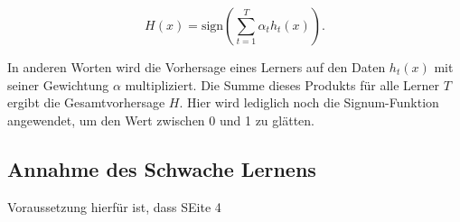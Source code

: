 \begin{equation}
    H(x) = \text{sign}\left(\sum_{t=1}^{T} \alpha_t h_t(x)\right).
\end{equation}
    
In anderen Worten wird die Vorhersage eines Lerners auf den Daten \( h_t(x) \) mit seiner Gewichtung \( \alpha \) multipliziert. Die Summe dieses Produkts für alle Lerner \( T \) ergibt die Gesamtvorhersage \( H \). Hier wird lediglich noch die Signum-Funktion angewendet, um den Wert zwischen 0 und 1 zu glätten.
    

\subsection{Annahme des Schwache Lernens}
Voraussetzung hierfür ist, dass SEite 4 